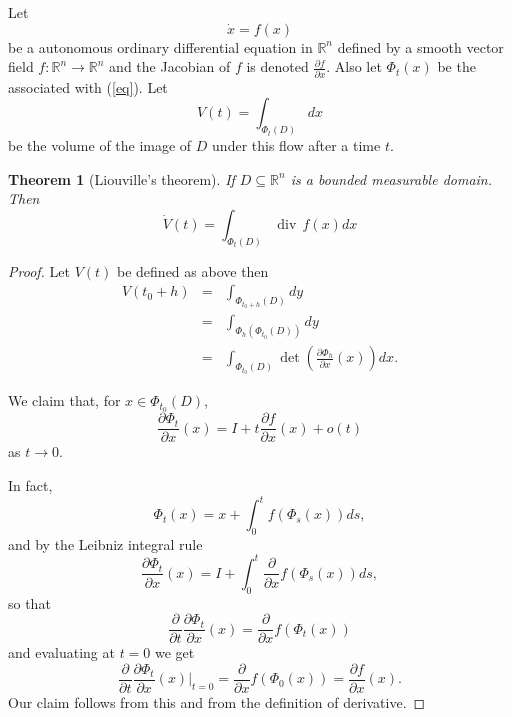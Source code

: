 \documentclass[12pt]{article}
\newtheorem{thm}{Theorem}
\begin{document}
Let
\begin{equation}
\dot{x}=f(x) \label{eq}
\end{equation}
be a autonomous ordinary differential equation in $\mathbb{R}^n$
defined by a smooth vector field $f\colon \mathbb{R}^n\to \mathbb{R}^n$ 
and the Jacobian of $f$ is denoted $\frac{\partial f}{\partial x}$. Also let $\Phi_t(x)$ be the  associated 
with (\ref{eq}).  Let 
$$V(t) = \int_{\Phi_t(D)} dx$$ 
be the volume of the image of $D$ under this flow after a time $t$.
\begin{thm}[Liouville's theorem]
If $D\subseteq \mathbb{R}^n$ is a bounded measurable domain. Then
$$\dot{V}(t)= \int_{\Phi_t(D)} \operatorname{div}\, f(x) dx$$
\end{thm}
\begin{proof}
Let $V(t)$ be defined as above then
\begin{eqnarray*}
V(t_0+h) 
& = & \int_{\Phi_{t_0+h}(D)}dy\\
& = & \int_{\Phi_h(\Phi_{t_0}(D))}dy\\
& = & \int_{\Phi_{t_0}(D)} \operatorname{det}\left(\frac{\partial\Phi_h}{\partial x}(x)\right) dx.
\end{eqnarray*}

We claim that, for $x\in \Phi_{t_0}(D)$,
$$\frac{\partial\Phi_t}{\partial x}(x) = I + t\frac{\partial f}{\partial x}(x) + o(t)$$
as $t\to 0$.

In fact, 
$$\Phi_t(x) = x + \int_{0}^t f(\Phi_s(x))ds,$$
and by the Leibniz integral rule
$$\frac{\partial \Phi_t}{\partial x}(x) = I + \int_{0}^t \frac{\partial}{\partial x}f(\Phi_s(x)) ds,$$
so that 
$$\frac{\partial}{\partial t} \frac{\partial \Phi_t}{\partial x}(x) = \frac{\partial}{\partial x}f(\Phi_t(x))$$
and evaluating at $t=0$ we get
$${\frac{\partial}{\partial t} \frac{\partial \Phi_t}{\partial x}(x)}\Big|_{t=0} = \frac{\partial}{\partial x}f(\Phi_0(x)) = \frac{\partial f}{\partial x} (x).$$
Our claim follows from this and from the definition of derivative.


\end{proof}
\end{document}
